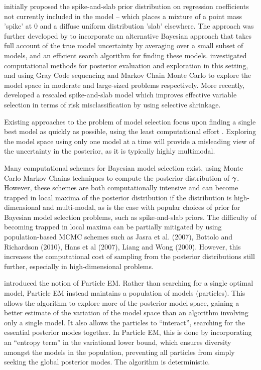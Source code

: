\cite{Mitchell1988} initially proposed the spike-and-slab prior distribution on
regression coefficients not currently included in the model -- which places a
mixture of a point mass 'spike' at $0$ and a diffuse uniform distribution
'slab' elsewhere. The approach was further developed by \cite{Madigan1994} to
incorporate an alternative Bayesian approach that takes full account of the
true model uncertainty by averaging over a small subset of models, and an
efficient search algorithm for finding these models. \cite{George1997}
investigated computational methods for posterior evaluation and exploration in
this setting, and using Gray Code sequencing and Markov Chain Monte Carlo to
explore the model space in moderate and large-sized problems respectively.
More recently, \cite{Ishwaran2005} developed a rescaled spike-and-slab model
which improves effective variable selection in terms of risk misclassification
by using selective shrinkage.


Existing approaches to the problem of model selection focus upon finding a
single best model as quickly as possible, using the least computational effort
\citep{You2014,Rockova2014}. Exploring the model space using only one
model at a time will provide a misleading view of the uncertainty in the
posterior, as it is typically highly multimodal.

Many computational schemes for Bayesian model selection exist, using Monte
Carlo Markov Chains techniques to compute the posterior distribution of
${\boldsymbol \gamma}$. However, these schemes are both computationally intensive and can
become trapped in local maxima of the posterior distribution if the
distribution is high-dimensional and multi-modal, as is the case with popular
choices of prior for Bayesian model selection problems, such as spike-and-slab
priors. The difficulty of becoming trapped in local maxima can be partially
mitigated by using population-based MCMC schemes such as Jasra et al. (2007),
Bottolo and Richardson (2010), Hans et al (2007), Liang and Wong (2000). However,
this increases the computational cost of sampling from the posterior
distributions still further, especially in high-dimensional problems.

\cite{Rockova2017} introduced the notion of Particle EM. Rather than searching
for a single optimal model, Particle EM instead maintains a population of
models (particles). This allows the algorithm to explore more of the posterior
model space, gaining a better estimate of the variation of the model space than
an algorithm involving only a single model. It also allows the particles to
``interact'', searching for the essential posterior modes together. In Particle
EM, this is done by incorporating an ``entropy term'' in the variational lower
bound, which ensures diversity amongst the models in the population, preventing
all particles from simply seeking the global posterior modes. The algorithm is
deterministic.


